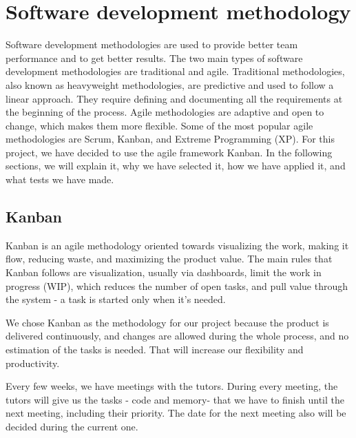 \chapter{Software development methodology}
\label{Software development methodology}

Software development methodologies \citep{agileAndTraditional} are used to provide better team performance and to get better results. The two main types of software development methodologies are traditional and agile. Traditional methodologies, also known as heavyweight methodologies, are predictive and used to follow a linear approach. They require defining and documenting all the requirements at the beginning of the process. Agile methodologies are adaptive and open to change, which makes them more flexible. Some of the most popular agile methodologies are Scrum, Kanban, and Extreme Programming (XP). For this project, we have decided to use the agile framework Kanban. In the following sections, we will explain it, why we have selected it, how we have applied it, and what tests we have made.

\section{Kanban}
\label{Kanban}
Kanban is an agile methodology oriented towards visualizing the work, making it flow, reducing waste, and maximizing the product value. The main rules that Kanban follows are visualization, usually via dashboards, limit the work in progress (WIP), which reduces the number of open tasks, and pull value through the system - a task is started only when it's needed.

We chose Kanban as the methodology for our project because the product is delivered continuously, and changes are allowed during the whole process, and no estimation of the tasks is needed. That will increase our flexibility and productivity.

Every few weeks, we have meetings with the tutors. During every meeting, the tutors will give us the tasks - code and memory- that we have to finish until the next meeting, including their priority. The date for the next meeting also will be decided during the current one.

